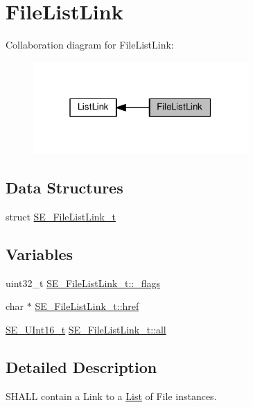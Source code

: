 \hypertarget{group__FileListLink}{}\section{File\+List\+Link}
\label{group__FileListLink}
Collaboration diagram for File\+List\+Link\+:\nopagebreak
\begin{figure}[H]
\begin{center}
\leavevmode
\includegraphics[width=232pt]{group__FileListLink}
\end{center}
\end{figure}
\subsection*{Data Structures}
\begin{DoxyCompactItemize}
\item 
struct \hyperlink{structSE__FileListLink__t}{S\+E\+\_\+\+File\+List\+Link\+\_\+t}
\end{DoxyCompactItemize}
\subsection*{Variables}
\begin{DoxyCompactItemize}
\item 
uint32\+\_\+t \hyperlink{group__FileListLink_gaced91cb9594ebae572e6a7216179d24d}{S\+E\+\_\+\+File\+List\+Link\+\_\+t\+::\+\_\+flags}
\item 
char $\ast$ \hyperlink{group__FileListLink_ga031e60ab342d2ccd4ac921fd30ffb9b1}{S\+E\+\_\+\+File\+List\+Link\+\_\+t\+::href}
\item 
\hyperlink{group__UInt16_gac68d541f189538bfd30cfaa712d20d29}{S\+E\+\_\+\+U\+Int16\+\_\+t} \hyperlink{group__FileListLink_ga29b8ccd48909ecad5f8c9f14eacafe2c}{S\+E\+\_\+\+File\+List\+Link\+\_\+t\+::all}
\end{DoxyCompactItemize}


\subsection{Detailed Description}
S\+H\+A\+LL contain a Link to a \hyperlink{structList}{List} of File instances. 

